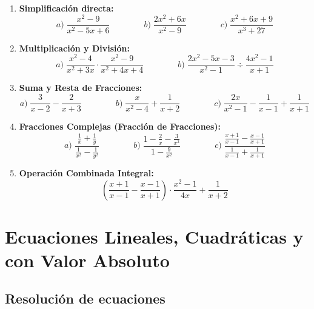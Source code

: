 \documentclass[12pt, letterpaper]{article}
\begin{document}
\begin{enumerate}[resume=ejercicios, leftmargin=*]
      \item \facil{} \textbf{Simplificación directa:}
            $$a)\; \frac{x^2 - 9}{x^2 - 5x + 6} \qquad\qquad b)\; \frac{2x^2 + 6x}{x^2 - 9} \qquad\qquad c)\; \frac{x^2 + 6x + 9}{x^3 + 27}$$

      \item \medio{} \textbf{Multiplicación y División:}
            $$a)\; \frac{x^2 - 4}{x^2 + 3x} \cdot \frac{x^2 - 9}{x^2 + 4x + 4} \qquad\qquad b)\; \frac{2x^2 - 5x - 3}{x^2 - 1} \div \frac{4x^2 - 1}{x + 1}$$

      \item \medio{} \textbf{Suma y Resta de Fracciones:}
            $$a)\; \frac{3}{x - 2} - \frac{2}{x + 3} \qquad\qquad b)\; \frac{x}{x^2 - 4} + \frac{1}{x + 2} \qquad\qquad c)\; \frac{2x}{x^2 - 1} - \frac{1}{x - 1} + \frac{1}{x + 1}$$

      \item \dificil{} \textbf{Fracciones Complejas (Fracción de Fracciones):}
            $$a)\; \frac{\frac{1}{x} + \frac{1}{y}}{\frac{1}{x^2} - \frac{1}{y^2}} \qquad\qquad b)\; \frac{1 - \frac{2}{x} - \frac{3}{x^2}}{1 - \frac{9}{x^2}} \qquad\qquad c)\; \frac{\frac{x + 1}{x - 1} - \frac{x - 1}{x + 1}}{\frac{1}{x - 1} + \frac{1}{x + 1}}$$

      \item \dificil{} \textbf{Operación Combinada Integral:}
            $$\left(\frac{x + 1}{x - 1} - \frac{x - 1}{x + 1}\right) \cdot \frac{x^2 - 1}{4x} + \frac{1}{x + 2}$$
\end{enumerate}

\newpage


\section{Ecuaciones Lineales, Cuadráticas y con Valor Absoluto}

\subsection{Resolución de ecuaciones}
\end{document}
